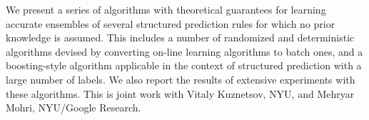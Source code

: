 We present a series of algorithms with theoretical guarantees for learning accurate ensembles of several structured prediction rules for which no prior knowledge is assumed. This includes a number of randomized and deterministic algorithms devised by converting on-line learning algorithms to batch ones, and a boosting-style algorithm applicable in the context of structured prediction with a large number of labels. We also report the results of extensive experiments with these algorithms. This is joint work with Vitaly Kuznetsov, NYU, and Mehryar Mohri, NYU/Google Research.

